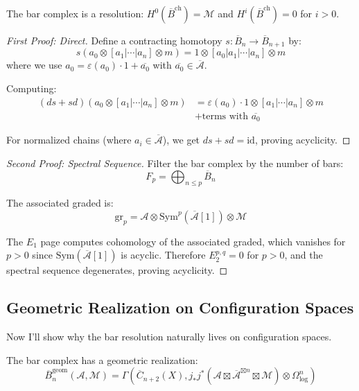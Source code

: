 \begin{theorem}
The bar complex is a resolution: $H^0(\overline{B}^{\text{ch}}) = \mathcal{M}$ and $H^i(\overline{B}^{\text{ch}}) = 0$ for $i > 0$.
\end{theorem}

\begin{proof}[First Proof: Direct]
Define a contracting homotopy $s: \overline{B}_n \to \overline{B}_{n+1}$ by:
\[
s(a_0 \otimes [a_1|\cdots|a_n] \otimes m) = 1 \otimes [a_0|a_1|\cdots|a_n] \otimes m
\]
where we use $a_0 = \varepsilon(a_0) \cdot 1 + \overline{a_0}$ with $\overline{a_0} \in \overline{\mathcal{A}}$.

Computing:
\begin{align}
(ds + sd)(a_0 \otimes [a_1|\cdots|a_n] \otimes m) &= \varepsilon(a_0) \cdot 1 \otimes [a_1|\cdots|a_n] \otimes m \\
&+ \text{terms with } \overline{a_0}
\end{align}

For normalized chains (where $a_i \in \overline{\mathcal{A}}$), we get $ds + sd = \text{id}$, proving acyclicity.
\end{proof}

\begin{proof}[Second Proof: Spectral Sequence]
Filter the bar complex by the number of bars:
\[
F_p = \bigoplus_{n \leq p} \overline{B}_n
\]

The associated graded is:
\[
\text{gr}_p = \mathcal{A} \otimes \text{Sym}^p(\overline{\mathcal{A}}[1]) \otimes \mathcal{M}
\]

The $E_1$ page computes cohomology of the associated graded, which vanishes for $p > 0$ since $\text{Sym}(\overline{\mathcal{A}}[1])$ is acyclic. Therefore $E_2^{p,q} = 0$ for $p > 0$, and the spectral sequence degenerates, proving acyclicity.
\end{proof}

\subsection{Geometric Realization on Configuration Spaces}

Now I'll show why the bar resolution naturally lives on configuration spaces.

\begin{theorem}
The bar complex has a geometric realization:
\[
\overline{B}_n^{\text{geom}}(\mathcal{A}, \mathcal{M}) = \Gamma(\overline{C}_{n+2}(X), j_*j^*(\mathcal{A} \boxtimes \overline{\mathcal{A}}^{\boxtimes n} \boxtimes \mathcal{M}) \otimes \Omega^n_{\log})
\]
\end{theorem}

